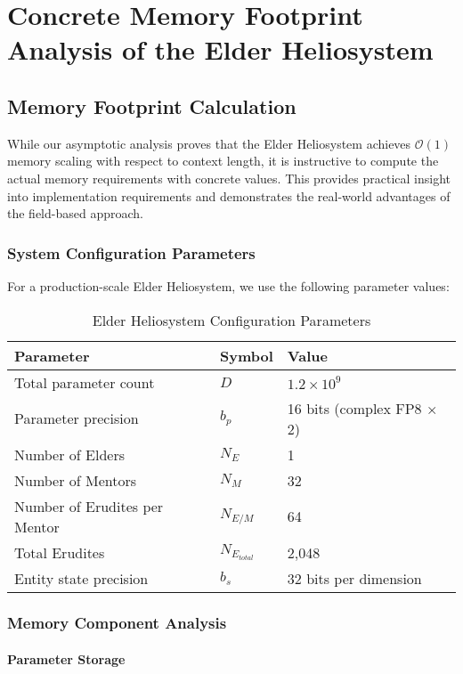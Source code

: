 \chapter{Concrete Memory Footprint Analysis of the Elder Heliosystem}

\section{Memory Footprint Calculation}

While our asymptotic analysis proves that the Elder Heliosystem achieves $\mathcal{O}(1)$ memory scaling with respect to context length, it is instructive to compute the actual memory requirements with concrete values. This provides practical insight into implementation requirements and demonstrates the real-world advantages of the field-based approach.

\subsection{System Configuration Parameters}

For a production-scale Elder Heliosystem, we use the following parameter values:

\begin{table}[h]
\centering
\begin{tabular}{|l|l|l|}
\hline
\textbf{Parameter} & \textbf{Symbol} & \textbf{Value} \\
\hline
Total parameter count & $D$ & $1.2 \times 10^9$ \\
Parameter precision & $b_p$ & 16 bits (complex FP8 × 2) \\
Number of Elders & $N_E$ & 1 \\
Number of Mentors & $N_M$ & 32 \\
Number of Erudites per Mentor & $N_{E/M}$ & 64 \\
Total Erudites & $N_{E_{total}}$ & 2,048 \\
Entity state precision & $b_s$ & 32 bits per dimension \\
\hline
\end{tabular}
\caption{Elder Heliosystem Configuration Parameters}
\end{table}

\subsection{Memory Component Analysis}

\subsubsection{Parameter Storage}


